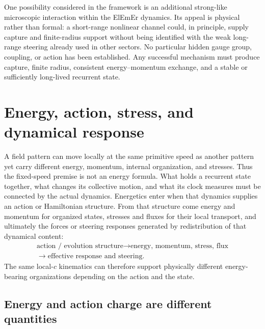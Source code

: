 \documentclass[11pt]{article}
\theoremstyle{definition}
\newcommand{\ElEmEr}{\mbox{ElEmEr}}
\begin{document}
One possibility considered in the framework is an additional strong-like microscopic
interaction within the \ElEmEr{} dynamics.  Its appeal is physical rather than formal: a
short-range nonlinear channel could, in principle, supply capture and finite-radius
support without being identified with the weak long-range steering already used in other
sectors.  No particular hidden gauge group, coupling, or action has been established.
Any successful mechanism must produce capture, finite radius, consistent energy--momentum
exchange, and a stable or sufficiently long-lived recurrent state.

\section{Energy, action, stress, and dynamical response}
\label{sec:energy_action}

A field pattern can move locally at the same primitive speed as another
pattern yet carry different energy, momentum, internal organization, and
stresses.  Thus the fixed-speed premise is not an energy formula.  What
holds a recurrent state together, what changes its collective motion, and
what its clock measures must be connected by the actual dynamics.
Energetics enter when that dynamics supplies an action or Hamiltonian
structure.  From that structure come energy and momentum for organized
states, stresses and fluxes for their local transport, and ultimately the forces or
steering responses generated by redistribution of that dynamical content:
\begin{equation}
\boxed{
\begin{gathered}
\text{action / evolution structure}
\longrightarrow
\text{energy, momentum, stress, flux}\\
\longrightarrow
\text{effective response and steering}.
\end{gathered}}
\label{eq:energy_hierarchy}
\end{equation}
The same local-$c$ kinematics can therefore support physically different energy-bearing
organizations depending on the action and the state.

\subsection{Energy and action charge are different quantities}
\label{subsec:energy_action_layers}
\end{document}
